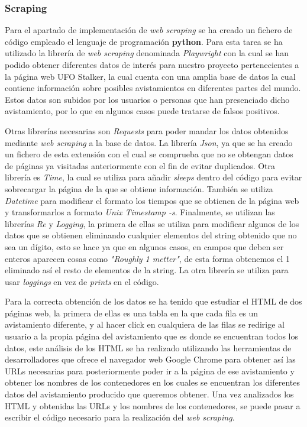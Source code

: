 \subsubsection{Scraping}

Para el apartado de implementación de \textit{web scraping} se ha creado un fichero de código empleado el lenguaje de programación \textbf{python}. Para esta tarea se ha utilizado la librería de \textit{web scraping} denominada \textit{Playwright} con la cual se han podido obtener diferentes datos de interés para nuestro proyecto pertenecientes a la página web UFO Stalker, la cual cuenta con una amplia base de datos la cual contiene información sobre posibles avistamientos en diferentes partes del mundo. Estos datos son subidos por los usuarios o personas que han presenciado dicho avistamiento, por lo que en algunos casos puede tratarse de falsos positivos.

Otras librerías necesarias son \textit{Requests} para poder mandar los datos obtenidos mediante \textit{web scraping} a la base de datos. La librería \textit{Json}, ya que se ha creado un fichero de esta extensión con el cual se comprueba que no se obtengan datos de páginas ya visitadas anteriormente con el fin de evitar duplicados. Otra librería es \textit{Time}, la cual se utiliza para añadir \textit{sleeps} dentro del código para evitar sobrecargar la página de la que se obtiene información. También se utiliza \textit{Datetime} para modificar el formato los tiempos que se obtienen de la página web y transformarlos a formato \textit{Unix Timestamp -s}. Finalmente, se utilizan las librerías \textit{Re} y \textit{Logging}, la primera de ellas se utiliza para modificar algunos de los datos que se obtienen eliminando cualquier elementos del string obtenido que no sea un dígito, esto se hace ya que en algunos casos, en campos que deben ser enteros aparecen cosas como \textit{"Roughly 1 metter"}, de esta forma obtenemos el 1 eliminado así el resto de elementos de la string. La otra librería se utiliza para usar \textit{loggings} en vez de \textit{prints} en el código.

Para la correcta obtención de los datos se ha tenido que estudiar el HTML de dos páginas web, la primera de ellas es una tabla en la que cada fila es un avistamiento diferente, y al hacer click en cualquiera de las filas se redirige al usuario a la propia página del avistamiento que es donde se encuentran todos los datos, este análisis de los HTML se ha realizado utilizando las herramientas de desarrolladores que ofrece el navegador web Google Chrome para obtener así las URLs necesarias para posteriormente poder ir a la página de ese avistamiento y obtener los nombres de los contenedores en los cuales se encuentran los diferentes datos del avistamiento producido que queremos obtener. Una vez analizados los HTML y obtenidas las URLs y los nombres de los contenedores, se puede pasar a escribir el código necesario para la realización del \textit{web scraping}. 

